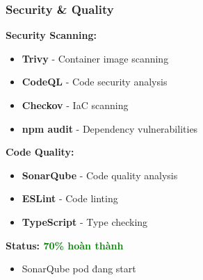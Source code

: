 \documentclass[aspectratio=169]{beamer}
\begin{document}
\begin{frame}
\frametitle{Security \& Quality}
\textbf{Security Scanning:}
\begin{itemize}
    \item[$\checkmark$] \textbf{Trivy} - Container image scanning
    \item[$\checkmark$] \textbf{CodeQL} - Code security analysis
    \item[$\checkmark$] \textbf{Checkov} - IaC scanning
    \item[$\checkmark$] \textbf{npm audit} - Dependency vulnerabilities
\end{itemize}

\vspace{0.3cm}
\textbf{Code Quality:}
\begin{itemize}
    \item[$\checkmark$] \textbf{SonarQube} - Code quality analysis
    \item[$\checkmark$] \textbf{ESLint} - Code linting
    \item[$\checkmark$] \textbf{TypeScript} - Type checking
\end{itemize}

\vspace{0.3cm}
\textbf{Status: \textcolor{green}{70\% hoàn thành}}
\begin{itemize}
    \item[$\sim$] SonarQube pod đang start
\end{itemize}
\end{frame}
\end{document}
